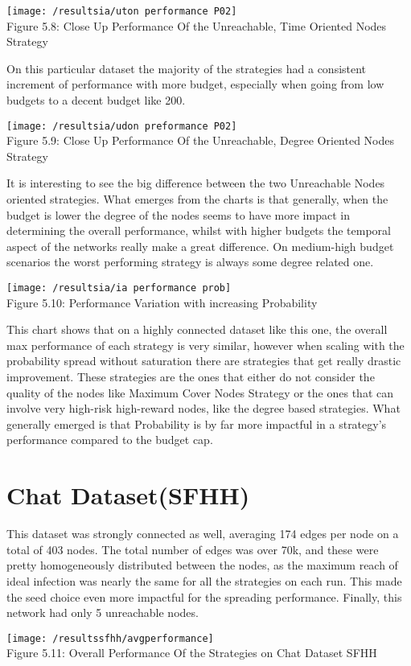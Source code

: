 \begin{center}
    \texttt{[image: /resultsia/uton performance P02]}
    \\
    Figure 5.8: Close Up Performance Of the Unreachable, Time Oriented Nodes Strategy
\end{center}

On this particular dataset the majority of the strategies had a consistent increment of performance with more budget, especially when going from low budgets to a decent budget like 200.

\begin{center}
    \texttt{[image: /resultsia/udon preformance P02]}
    \\
    Figure 5.9: Close Up Performance Of the Unreachable, Degree Oriented Nodes Strategy
\end{center}

It is interesting to see the big difference between the two Unreachable Nodes oriented strategies. What emerges from the charts is that generally, when the budget is lower the degree of the nodes seems to have more impact in determining the overall performance, whilst with higher budgets the temporal aspect of the networks really make a great difference. On medium-high budget scenarios the worst performing strategy is always some degree related one.

\begin{center}
    \texttt{[image: /resultsia/ia performance prob]}
    \\
    Figure 5.10: Performance Variation with increasing Probability
\end{center}

This chart shows that on a highly connected dataset like this one, the overall max performance of each strategy is very similar, however when scaling with the probability spread without saturation there are strategies that get really drastic improvement. These strategies are the ones that either do not consider the quality of the nodes like Maximum Cover Nodes Strategy or the ones that can involve very high-risk high-reward nodes, like the degree based strategies. What generally emerged is that Probability is by far more impactful in a strategy's performance compared to the budget cap.

\section{Chat Dataset(SFHH)}
\label{sec:sfhhres}
This dataset was strongly connected as well, averaging 174 edges per node on a total of 403 nodes. The total number of edges was over 70k, and these were pretty homogeneously distributed between the nodes, as the maximum reach of ideal infection was nearly the same for all the strategies on each run. This made the seed choice even more impactful for the spreading performance. Finally, this network had only 5 unreachable nodes.
\begin{center}
    \texttt{[image: /resultssfhh/avgperformance]}
    \\
    Figure 5.11: Overall Performance Of the Strategies on Chat Dataset SFHH
\end{center}

